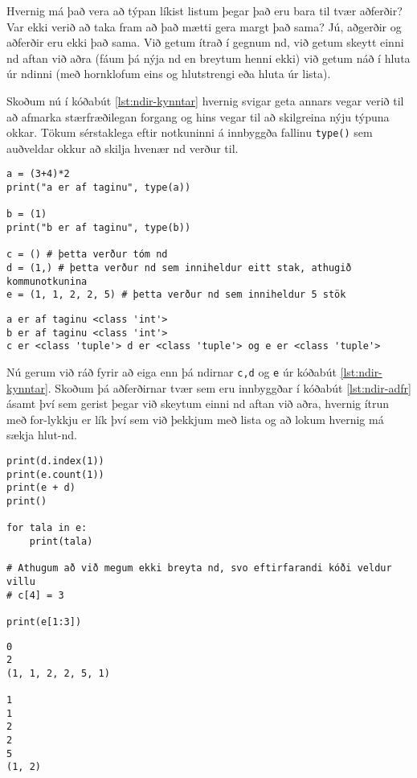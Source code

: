 Hvernig má það vera að týpan líkist listum þegar það eru bara til tvær aðferðir?
Var ekki verið að taka fram að það mætti gera margt það sama?
Jú, aðgerðir og aðferðir eru ekki það sama.
Við getum ítrað í gegnum nd, við getum skeytt einni nd aftan við aðra (fáum þá nýja nd en breytum henni ekki) við getum náð í hluta úr ndinni (með hornklofum eins og hlutstrengi eða hluta úr lista).

Skoðum nú í kóðabút \ref{lst:ndir-kynntar} hvernig svigar geta annars vegar verið til að afmarka stærfræðilegan forgang og hins vegar til að skilgreina nýju týpuna okkar.
Tökum sérstaklega eftir notkuninni á innbyggða fallinu \texttt{type()} sem auðveldar okkur að skilja hvenær nd verður til.

\begin{lstlisting}[caption=Ndir skilgreindar, label=lst:ndir-kynntar]
a = (3+4)*2
print("a er af taginu", type(a))

b = (1)
print("b er af taginu", type(b))

c = () # þetta verður tóm nd
d = (1,) # þetta verður nd sem inniheldur eitt stak, athugið kommunotkunina
e = (1, 1, 2, 2, 5) # þetta verður nd sem inniheldur 5 stök
\end{lstlisting}
\lstset{style=uttak}
\begin{lstlisting}
a er af taginu <class 'int'>
b er af taginu <class 'int'>
c er <class 'tuple'> d er <class 'tuple'> og e er <class 'tuple'>
\end{lstlisting}
\lstset{style=venjulegt}

Nú gerum við ráð fyrir að eiga enn þá ndirnar \texttt{c,d} og \texttt{e} úr kóðabút \ref{lst:ndir-kynntar}.
Skoðum þá aðferðirnar tvær sem eru innbyggðar í kóðabút \ref{lst:ndir-adfr} ásamt því sem gerist þegar við skeytum einni nd aftan við aðra, hvernig ítrun með for-lykkju er lík því sem við þekkjum með lista og að lokum hvernig má sækja hlut-nd.

\begin{lstlisting}[caption=Ndir aðgerðir og aðferðir , label=lst:ndir-adfr]
print(d.index(1))
print(e.count(1)) 
print(e + d)
print()

for tala in e:
	print(tala)

# Athugum að við megum ekki breyta nd, svo eftirfarandi kóði veldur villu
# c[4] = 3

print(e[1:3])
\end{lstlisting}
\lstset{style=uttak}
\begin{lstlisting}
0
2
(1, 1, 2, 2, 5, 1)

1
1
2
2
5
(1, 2)
\end{lstlisting}
\lstset{style=venjulegt}



